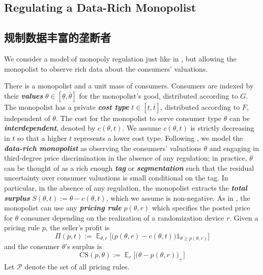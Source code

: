 \documentclass[12pt,letterpaper]{article}
\newenvironment{original}{\color{black}\noindent}{}
\newenvironment{translation}{\color{blue}\noindent}{}
\theoremstyle{plain}
\theoremstyle{definition}
\theoremstyle{remark}
\DeclareMathOperator{\E}{\mathds{E}}
\renewcommand{\1}{\mathds{1}}
\theoremstyle{definition}
\begin{document}
\begin{original}
\subsection{Regulating a Data-Rich Monopolist}
\end{original}
\begin{translation}
\subsection{规制数据丰富的垄断者}
\end{translation}

\begin{original}
We consider a model of monopoly regulation just like in \citet{Baron1982RegulatingCosts}, but allowing the monopolist to observe rich data about the consumers' valuations.

There is a monopolist and a unit mass of consumers. Consumers are indexed by their \textit{\textbf{values}} $\theta \in [\underline{\theta}, \overline{\theta}]$ for the monopolist's good, distributed according to $G$. The monopolist has a private \textit{\textbf{cost type}} $t \in [\underline{t}, \overline{t}]$, distributed according to $F$, independent of $\theta$. The cost for the monopolist to serve consumer type $\theta$ can be \textit{\textbf{interdependent}}, denoted by $c(\theta, t)$. We assume $c(\theta, t)$ is strictly decreasing in $t$ so that a  higher $t$ represents a lower cost type. Following \citet{strack2025non}, we model the  \textit{\textbf{data-rich monopolist}} as observing the consumers' valuations $\theta$ and engaging in third-degree price discrimination in the absence of any regulation; in practice, $\theta$ can be thought of as a rich enough \textit{\textbf{tag}} or \textit{\textbf{segmentation}} such that the residual uncertainty over consumer valuations is small conditional on the tag. In particular, in the absence of any regulation, the monopolist extracts the \textit{\textbf{total surplus}} $S(\theta, t):= \theta - c(\theta, t)$,
which we assume is non-negative. As in \citet{strack2025non}, the monopolist can use any \textit{\textbf{pricing rule}} $p(\theta, r)$ which specifies the posted price for $\theta$ consumer depending on the realization of a randomization device $r$. Given a pricing rule $p$, the seller's profit is
\[\Pi(p, t) := \E_{\theta, r}\Big[\Big(p(\theta, r) - c(\theta, t) \Big) \1_{\theta \geq p(\theta, r)} \Big]\]
and the consumer $\theta$'s surplus is
\[\text{CS}(p, \theta) := \E_r\Big[\big(\theta - p(\theta, r)\big)_+\Big]\]
Let $\mathcal{P}$ denote the set of all pricing rules.


\end{original}
\end{document}
